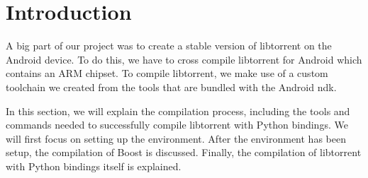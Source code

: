\section{Introduction}
	A big part of our project was to create a stable version of libtorrent on the Android device. To do this, we have to cross compile libtorrent for  Android which contains an ARM chipset. To compile libtorrent, we make use of a custom toolchain we created from the tools that are bundled with the Android ndk.
	
	In this section, we will explain the compilation process, including the tools and commands needed to successfully compile libtorrent with Python bindings. We will first focus on setting up the environment. After the environment has been setup, the compilation of Boost is discussed. Finally, the compilation of libtorrent with Python bindings itself is explained.